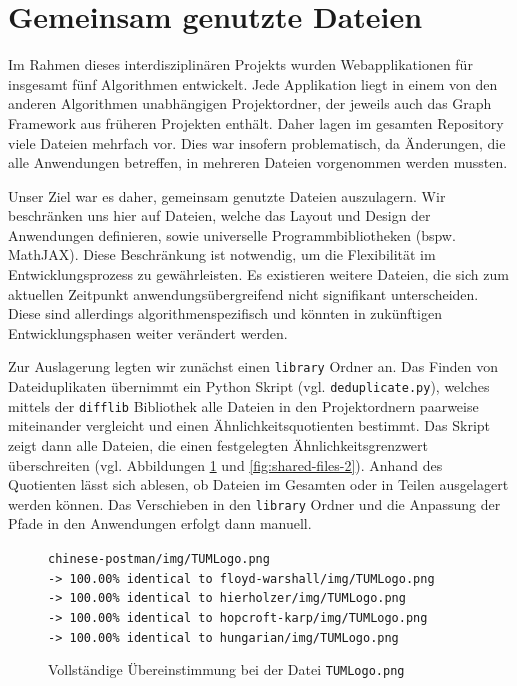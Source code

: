 \section{Gemeinsam genutzte Dateien} %
Im Rahmen dieses interdisziplinären Projekts wurden Webapplikationen für insgesamt fünf Algorithmen entwickelt. Jede Applikation liegt in einem von den anderen Algorithmen unabhängigen Projektordner, der jeweils auch das Graph Framework aus früheren Projekten enthält. Daher lagen im gesamten Repository viele Dateien mehrfach vor. Dies war insofern problematisch, da Änderungen, die alle Anwendungen betreffen, in mehreren Dateien vorgenommen werden mussten.

Unser Ziel war es daher, gemeinsam genutzte Dateien auszulagern. Wir beschränken uns hier auf Dateien, welche das Layout und Design der Anwendungen definieren, sowie universelle Programmbibliotheken (bspw. MathJAX). Diese Beschränkung ist notwendig, um die Flexibilität im Entwicklungsprozess zu gewährleisten. Es existieren weitere Dateien, die sich zum aktuellen Zeitpunkt anwendungsübergreifend nicht signifikant unterscheiden. Diese sind allerdings algorithmenspezifisch und könnten in zukünftigen Entwicklungsphasen weiter verändert werden.

Zur Auslagerung legten wir zunächst einen \texttt{library} Ordner an. Das Finden von Dateiduplikaten übernimmt ein Python Skript (vgl. \texttt{deduplicate.py}), welches mittels der \texttt{difflib} Bibliothek alle Dateien in den Projektordnern paarweise miteinander vergleicht und einen Ähnlichkeitsquotienten bestimmt. Das Skript zeigt dann alle Dateien, die einen festgelegten Ähnlichkeitsgrenzwert überschreiten (vgl. Abbildungen \ref{fig:shared-files-1} und \ref{fig:shared-files-2}). Anhand des Quotienten lässt sich ablesen, ob Dateien im Gesamten oder in Teilen ausgelagert werden können. Das Verschieben in den \texttt{library} Ordner und die Anpassung der Pfade in den Anwendungen erfolgt dann manuell.

\begin{figure}[h!]
\noindent\texttt{chinese-postman/img/TUMLogo.png \\
-> 100.00\% identical to floyd-warshall/img/TUMLogo.png \\
-> 100.00\% identical to hierholzer/img/TUMLogo.png \\
-> 100.00\% identical to hopcroft-karp/img/TUMLogo.png \\
-> 100.00\% identical to hungarian/img/TUMLogo.png
}
\caption[Gemeinsame Dateien: Beispiel 1]{Vollständige Übereinstimmung bei der Datei \texttt{TUMLogo.png}}\label{fig:shared-files-1}
\end{figure}

